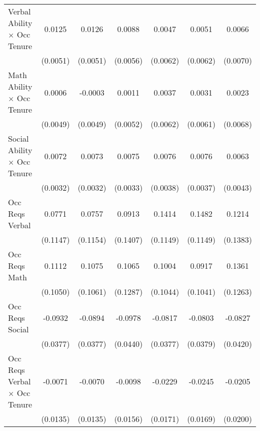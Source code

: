 {\begin{longtable}{l*{6}{c}}
Verbal Ability $\times$ Occ Tenure&      0.0125\sym{**} &      0.0126\sym{**} &      0.0088         &      0.0047         &      0.0051         &      0.0066         \\
                    &    (0.0051)         &    (0.0051)         &    (0.0056)         &    (0.0062)         &    (0.0062)         &    (0.0070)         \\
Math Ability $\times$ Occ Tenure&      0.0006         &     -0.0003         &      0.0011         &      0.0037         &      0.0031         &      0.0023         \\
                    &    (0.0049)         &    (0.0049)         &    (0.0052)         &    (0.0062)         &    (0.0061)         &    (0.0068)         \\
Social Ability $\times$ Occ Tenure&      0.0072\sym{**} &      0.0073\sym{**} &      0.0075\sym{**} &      0.0076\sym{**} &      0.0076\sym{**} &      0.0063         \\
                    &    (0.0032)         &    (0.0032)         &    (0.0033)         &    (0.0038)         &    (0.0037)         &    (0.0043)         \\
Occ Reqs Verbal     &      0.0771         &      0.0757         &      0.0913         &      0.1414         &      0.1482         &      0.1214         \\
                    &    (0.1147)         &    (0.1154)         &    (0.1407)         &    (0.1149)         &    (0.1149)         &    (0.1383)         \\
Occ Reqs Math       &      0.1112         &      0.1075         &      0.1065         &      0.1004         &      0.0917         &      0.1361         \\
                    &    (0.1050)         &    (0.1061)         &    (0.1287)         &    (0.1044)         &    (0.1041)         &    (0.1263)         \\
Occ Reqs Social     &     -0.0932\sym{**} &     -0.0894\sym{**} &     -0.0978\sym{**} &     -0.0817\sym{**} &     -0.0803\sym{**} &     -0.0827\sym{**} \\
                    &    (0.0377)         &    (0.0377)         &    (0.0440)         &    (0.0377)         &    (0.0379)         &    (0.0420)         \\
Occ Reqs Verbal $\times$ Occ Tenure&     -0.0071         &     -0.0070         &     -0.0098         &     -0.0229         &     -0.0245         &     -0.0205         \\
                    &    (0.0135)         &    (0.0135)         &    (0.0156)         &    (0.0171)         &    (0.0169)         &    (0.0200)         \\

\end{longtable}}

